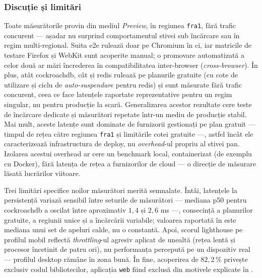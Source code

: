 \subsubsection{Discuție și limitări}\label{subsec:discutie-limitari}

Toate măsurătorile provin din mediul \textit{Preview}, în regiunea \texttt{fra1}, fără trafic concurent --- așadar nu surprind comportamentul stivei sub încărcare sau în regim multi-regional. Suita \acrshort{e2e} rulează doar pe Chromium în \acrshort{ci}, iar matricile de testare Firefox și WebKit sunt acoperite manual; o promovare automatizată a celor două ar mări încrederea în compatibilitatea inter-browser (\textit{cross-browser}). În plus, atât \gls{cockroachdb}, cât și \gls{redis} rulează pe planurile gratuite (cu cote de utilizare și ciclu de \textit{auto-suspendare} pentru \gls{redis}) și sunt măsurate fără trafic concurent, ceea ce face latențele raportate reprezentative pentru un regim singular, nu pentru producție la scară. Generalizarea acestor rezultate cere teste de încărcare dedicate și măsurători repetate într-un mediu de producție stabil. Mai mult, aceste latențe sunt dominate de furnizorii gestionați pe plan gratuit --- timpul de rețea către regiunea \texttt{fra1} și limitările cotei gratuite ---, astfel încât ele caracterizează infrastructura de deploy, nu \textit{overhead}-ul propriu al stivei \gls{pan}. Izolarea acestui overhead ar cere un benchmark local, containerizat (de exemplu cu Docker), fără latența de rețea a furnizorilor de cloud --- o direcție de măsurare lăsată lucrărilor viitoare.

Trei limitări specifice noilor măsurători merită semnalate. Întâi, latențele la persistență variază sensibil între seturile de măsurători --- mediana \acrshort{p50} pentru \gls{cockroachdb} a oscilat între aproximativ \(1{,}4\) și \(2{,}6\) ms ---, consecință a planurilor gratuite, a regiunii unice și a încărcării variabile; valoarea raportată în  este mediana unui set de apeluri calde, nu o constantă. Apoi, scorul \gls{lighthouse} pe profilul mobil reflectă \textit{throttling}-ul agresiv aplicat de unealtă (rețea lentă și procesor încetinit de patru ori), nu performanța percepută pe un dispozitiv real --- profilul desktop rămâne în zona bună. În fine, acoperirea de \(82{,}2\,\%\) privește exclusiv codul bibliotecilor, aplicația \texttt{web} fiind exclusă din motivele explicate în .
